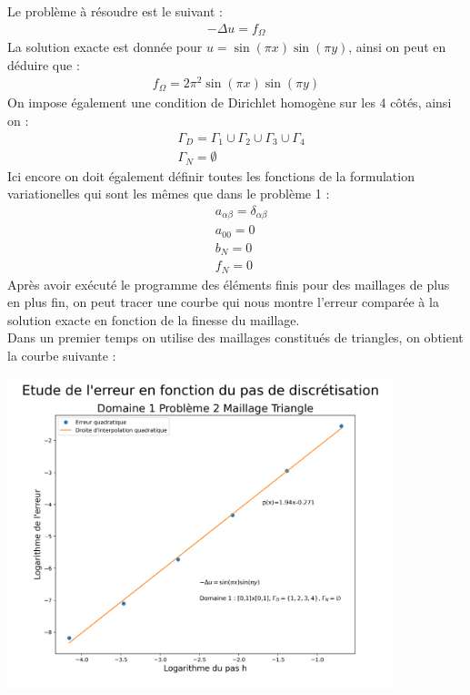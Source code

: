 \documentclass[a4paper, 12pt, french]{report}
\begin{document}
Le problème à résoudre est le suivant : 
\begin{align*}
    -\Delta u = f_\Omega
\end{align*}
La solution exacte est donnée pour $u=\sin(\pi x)\sin(\pi y)$, ainsi on peut en déduire que :
\begin{align*}
    f_\Omega = 2\pi^2\sin(\pi x)\sin(\pi y)
\end{align*}
On impose également une condition de Dirichlet homogène sur les 4 côtés, ainsi on : 
\begin{align*}
    &\Gamma_D = \Gamma_1 \cup\Gamma_2 \cup\Gamma_3 \cup\Gamma_4\\
    &\Gamma_N = \emptyset
\end{align*}
Ici encore on doit également définir toutes les fonctions de la formulation variationelles qui sont les mêmes que dans le problème 1 : 
\begin{align*}
    &a_{\alpha\beta} = \delta_{\alpha\beta}\\
    &a_{00} = 0\\
    &b_N = 0\\
    &f_N = 0
\end{align*}
Après avoir exécuté le programme des éléments finis pour des maillages de plus en plus fin, on peut tracer une courbe qui nous montre l'erreur comparée à la solution exacte en fonction de la finesse du maillage.\\
Dans un premier temps on utilise des maillages constitués de triangles, on obtient la courbe suivante :

\begin{center}
    \includegraphics[height=9cm]{../Images/Courbes_Erreurs/D1P2T.png}
\end{center}
\end{document}
